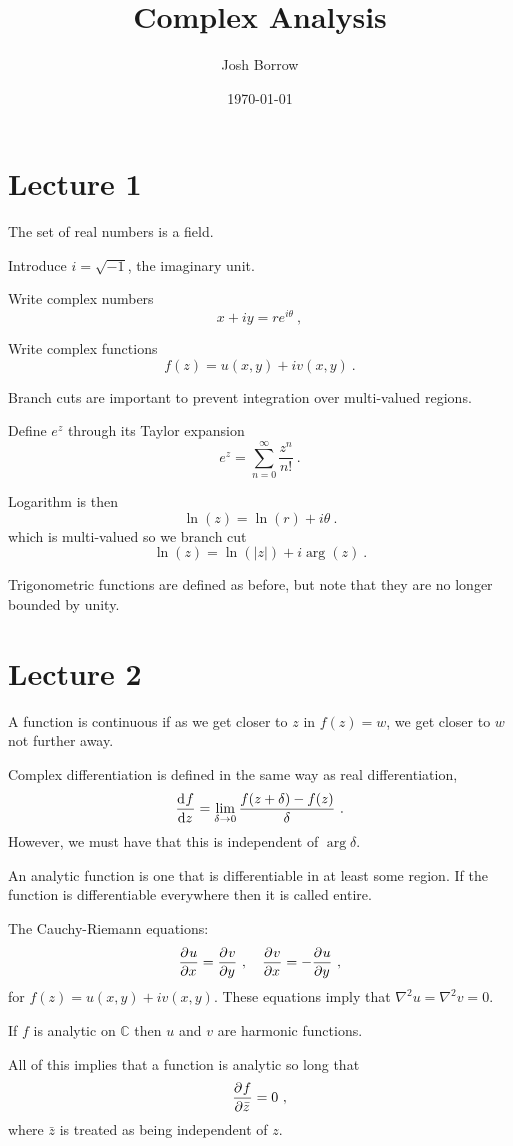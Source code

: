 \documentclass[11pt, a4paper]{report}
\begin{document}
\title{Complex Analysis}
\author{Josh Borrow}
\date{\today}

\section{Lecture 1}

The set of real numbers is a field.

Introduce $i = \sqrt{-1}$, the imaginary unit.

Write complex numbers
$$
	x+iy = re^{i\theta}~,
$$

Write complex functions
$$
	f(z) = u(x,y) + iv(x,y)~.
$$

Branch cuts are important to prevent integration over multi-valued regions.

Define $e^z$ through its Taylor expansion
$$
	e^z = \sum_{n=0}^\infty \frac{z^n}{n!}~.
$$

Logarithm is then
$$
	\ln(z) = \ln(r) + i\theta~.
$$
which is multi-valued so we branch cut
$$
	\ln(z) = \ln(|z|) + i \arg(z)~.
$$

Trigonometric functions are defined as before, but note that they are no longer bounded by unity.

\section{Lecture 2}

A function is continuous if as we get closer to $z$ in $f(z)=w$, we get closer to $w$ not further away.

Complex differentiation is defined in the same way as real differentiation,
$$
	\frac{\mathrm{d}^{} {f}}{\mathrm{d} {z}^{}} = \lim_{\delta \rightarrow 0}\frac{f(z + \delta) - f(z)}{\delta}~.
$$
However, we must have that this is independent of $\arg{\delta}$.

An analytic function is one that is differentiable in at least some region.
If the function is differentiable everywhere then it is called entire.

The Cauchy-Riemann equations:
$$
	\frac{\partial^{} {u}}{\partial {x}^{}} = \frac{\partial^{} {v}}{\partial {y}^{}}~, ~~~\frac{\partial^{} {v}}{\partial {x}^{}} = -\frac{\partial^{} {u}}{\partial {y}^{}}~,
$$
for $f(z) = u(x,y) + iv(x,y)$. These equations imply that $\nabla^2 u = \nabla^2 v = 0$.

If $f$ is analytic on $\mathbb{C}$ then $u$ and $v$ are harmonic functions. 

All of this implies that a function is analytic so long that
$$
	\frac{\partial^{} {f}}{\partial {\bar{z}}^{}} = 0~,
$$
where $\bar{z}$ is treated as being independent of $z$.
\end{document}

